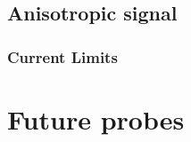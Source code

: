 
\subsection{Anisotropic signal}

\subsubsection{Current Limits}

\section{Future probes}
\label{sec:eor_intro_future}
% 
% 


%



%






